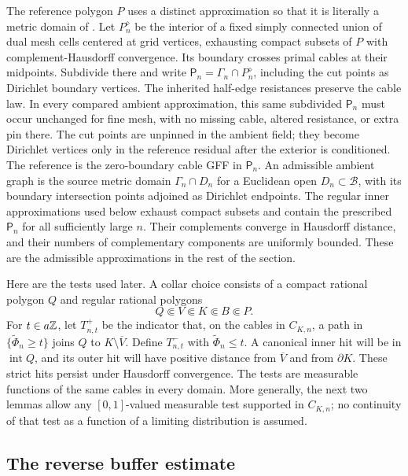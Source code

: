The reference polygon \(P\) uses a distinct approximation so that it
is literally a metric domain of \cite[Section~4.1]{ALS2018}. Let
\(P_n^\diamond\) be the interior of a fixed simply connected union of dual
mesh cells centered at grid vertices, exhausting compact subsets of
\(P\) with complement-Hausdorff convergence. Its boundary crosses
primal cables at their midpoints. Subdivide there and write
\(\mathsf P_n=\Gamma_n\cap P_n^\diamond\), including the cut points
as Dirichlet boundary vertices. The inherited half-edge resistances
preserve the cable law. In every compared ambient approximation,
this same subdivided \(\mathsf P_n\) must occur unchanged for fine
mesh, with no missing cable, altered resistance, or extra pin there.
The cut points are unpinned in the ambient field; they become Dirichlet
vertices only in the reference residual after the exterior is conditioned.
The reference is the zero-boundary cable GFF in \(\mathsf P_n\).
An admissible ambient graph is the source metric domain
\(\Gamma_n\cap D_n\) for a Euclidean open \(D_n\subset\mathcal B\),
with its boundary intersection points adjoined as Dirichlet endpoints.
The regular inner approximations used below exhaust compact subsets
and contain the prescribed \(\mathsf P_n\) for all sufficiently large
\(n\). Their complements converge in Hausdorff distance, and their
numbers of complementary components are uniformly bounded. These are
the admissible approximations in the rest of the section.

Here are the tests used later. A collar choice consists of a compact
rational polygon \(Q\) and regular rational polygons
\[
             Q\Subset V\Subset K\Subset B\Subset P.
\]
For \(t\in a\mathbb Z\), let \(T_{n,t}^{+}\) be the indicator that, on the
cables in \(C_{K,n}\), a path in \(\{\widetilde\Phi_n\ge t\}\) joins
\(Q\) to \(K\setminus\overline V\). Define \(T_{n,t}^{-}\) with
\(\widetilde\Phi_n\le t\). A canonical inner hit will be in
\(\operatorname{int}Q\), and its outer hit will have positive distance
from \(\overline V\) and from \(\partial K\). These strict hits persist
under Hausdorff convergence. The tests are measurable functions of the
same cables in every domain. More generally, the next two lemmas allow
any \([0,1]\)-valued measurable test supported in \(C_{K,n}\); no
continuity of that test as a function of a limiting distribution is
assumed.

\subsection{The reverse buffer estimate}


